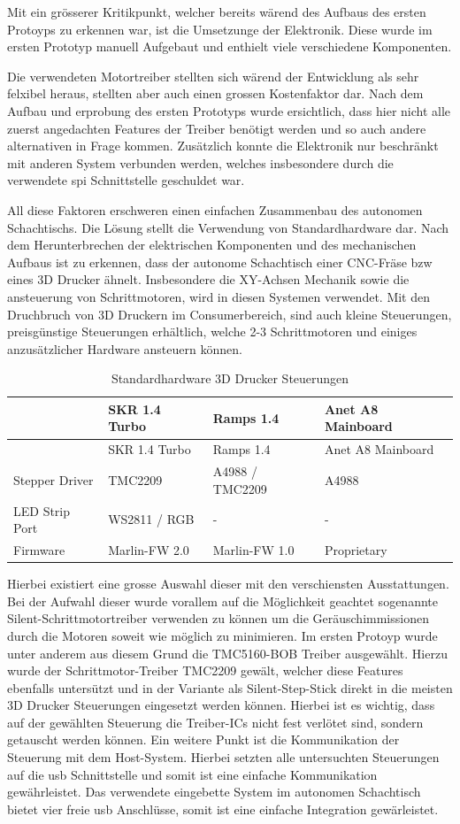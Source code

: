 Mit ein grösserer Kritikpunkt, welcher bereits wärend des Aufbaus des
ersten Protoyps zu erkennen war, ist die Umsetzunge der Elektronik.
Diese wurde im ersten Prototyp manuell Aufgebaut und enthielt viele
verschiedene Komponenten.

Die verwendeten Motortreiber stellten sich wärend der Entwicklung als
sehr felxibel heraus, stellten aber auch einen grossen Kostenfaktor dar.
Nach dem Aufbau und erprobung des ersten Prototyps wurde ersichtlich,
dass hier nicht alle zuerst angedachten Features der Treiber benötigt
werden und so auch andere alternativen in Frage kommen. Zusätzlich
konnte die Elektronik nur beschränkt mit anderen System verbunden
werden, welches insbesondere durch die verwendete \gls{spi}
Schnittstelle geschuldet war.

All diese Faktoren erschweren einen einfachen Zusammenbau des autonomen
Schachtischs. Die Lösung stellt die Verwendung von Standardhardware dar.
Nach dem Herunterbrechen der elektrischen Komponenten und des
mechanischen Aufbaus ist zu erkennen, dass der autonome Schachtisch
einer CNC-Fräse bzw eines 3D Drucker ähnelt. Insbesondere die XY-Achsen
Mechanik sowie die ansteuerung von Schrittmotoren, wird in diesen
Systemen verwendet. Mit den Druchbruch von 3D Druckern im
Consumerbereich, sind auch kleine Steuerungen, preisgünstige Steuerungen
erhältlich, welche 2-3 Schrittmotoren und einiges anzusätzlicher
Hardware ansteuern können.

\begin{longtable}[]{@{}llll@{}}
\caption{Standardhardware 3D Drucker Steuerungen}\tabularnewline
\toprule
& SKR 1.4 Turbo & Ramps 1.4 & Anet A8 Mainboard\tabularnewline
\midrule
\endfirsthead
\toprule
& SKR 1.4 Turbo & Ramps 1.4 & Anet A8 Mainboard\tabularnewline
\midrule
\endhead
Stepper Driver & TMC2209 & A4988 / TMC2209 & A4988\tabularnewline
LED Strip Port & WS2811 / RGB & - & -\tabularnewline
Firmware & Marlin-FW 2.0 & Marlin-FW 1.0 & Proprietary\tabularnewline
\bottomrule
\end{longtable}

Hierbei existiert eine grosse Auswahl dieser mit den verschiensten
Ausstattungen. Bei der Aufwahl dieser wurde vorallem auf die Möglichkeit
geachtet sogenannte Silent-Schrittmotortreiber verwenden zu können um
die Geräuschimmissionen durch die Motoren soweit wie möglich zu
minimieren. Im ersten Protoyp wurde unter anderem aus diesem Grund die
TMC5160-BOB Treiber ausgewählt. Hierzu wurde der Schrittmotor-Treiber
TMC2209 gewält, welcher diese Features ebenfalls untersützt und in der
Variante als Silent-Step-Stick direkt in die meisten 3D Drucker
Steuerungen eingesetzt werden können. Hierbei ist es wichtig, dass auf
der gewählten Steuerung die Treiber-ICs nicht fest verlötet sind,
sondern getauscht werden können. Ein weitere Punkt ist die Kommunikation
der Steuerung mit dem Host-System. Hierbei setzten alle untersuchten
Steuerungen auf die \gls{usb} Schnittstelle und somit ist eine einfache
Kommunikation gewährleistet. Das verwendete eingebette System im
autonomen Schachtisch bietet vier freie \gls{usb} Anschlüsse, somit ist
eine einfache Integration gewärleistet.

